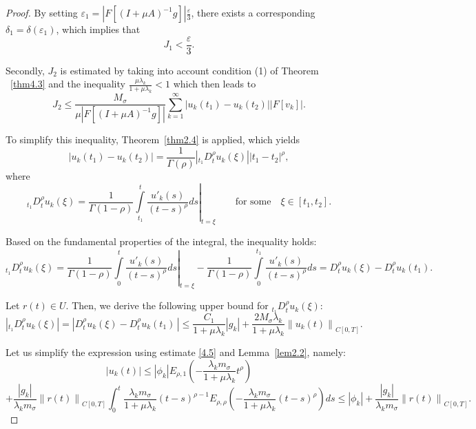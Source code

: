 \documentclass[reqno]{amsart}
\theoremstyle{definition}
\numberwithin{equation}{section}
\begin{document}
\begin{proof}
By setting $\varepsilon_1=\left| F[{{(I+\mu A)}^{-1}}g] \right|\frac{\varepsilon}{3}$, there exists a corresponding $\delta_1=\delta(\varepsilon_1)$, which implies that 
\begin{equation}\label{5.13}
   J_1 <\frac{\varepsilon}{3}. 
\end{equation}

Secondly, $J_2$ is estimated by taking into account condition (1) of Theorem ~\ref{thm4.3} and the inequality $\frac{\mu \lambda_k}{1+\mu \lambda_k}<1$ which then leads to
$$
{{J}_{2}}\le \frac{{{M}_{\sigma }}}{\mu \left| F[{{(I+\mu A)}^{-1}}g] \right|}\sum\limits_{k=1}^{\infty }{\left| {{u}_{k}}\left( {{t}_{1}} \right)-{{u}_{k}}\left( {{t}_{2}} \right) \right|\left| F\left[ {{v}_{k}} \right] \right|}.
$$

To simplify this inequality, Theorem~\ref{thm2.4} is applied, which yields
\begin{equation} \label{5.14}
 \left|u_k\left(t_1\right)-u_k\left(t_2\right)\right| = \frac{1}{\Gamma(\rho)}\left|_{t_1}D_t^\rho u_k(\xi)\right|\left|t_1-t_2\right|^\rho,   
\end{equation}
where 
$$
_{t_1}D_{t}^{\rho }{{u}_{k}}(\xi )=\frac{1}{\Gamma (1-\rho )}{{\left. \int\limits_{{{t}_{1}}}^{t}{\frac{u'_k(s)}{{{(t-s)}^{\rho }}}}ds \right|}_{t=\xi}} \qquad \text{for some} \quad \xi \in [t_1,t_2].
$$

Based on the fundamental properties of the integral, the  inequality holds:
$$
_{{{t}_{1}}}D_{t}^{\rho }{{u}_{k}}(\xi )=\frac{1}{\Gamma (1-\rho )}{{\left. \int\limits_{0}^{t}{\frac{{{{{u}'}}_{k}}(s)}{{{(t-s)}^{\rho }}}}ds \right|}_{t=\xi }}-\frac{1}{\Gamma (1-\rho )}\int\limits_{0}^{{{t}_{1}}}{\frac{{{{{u}'}}_{k}}(s)}{{{(t-s)}^{\rho }}}}ds=D_{t}^{\rho }{{u}_{k}}(\xi )-D_{t}^{\rho }{{u}_{k}}({{t}_{1}}).
$$

Let $r(t) \in U$. Then, we derive the following upper bound for $_{t_1}D_t^{\rho} u_k(\xi)$:
\begin{equation}\label{5.15}
 \left| _{{{t}_{1}}}D_{t}^{\rho }{{u}_{k}}(\xi ) \right|=\left| D_{t}^{\rho }{{u}_{k}}(\xi )-D_{t}^{\rho }{{u}_{k}}({{t}_{1}})\, \right|\le \frac{{{C}_{1}}}{1+\mu {{\lambda }_{k}}}\left| {{g}_{k}} \right|+\frac{2{{M}_{\sigma }}{{\lambda }_{k}}}{1+\mu {{\lambda }_{k}}}{{\left\| {{u}_{k}}(t) \right\|}_{C[0,T]}}. 
\end{equation}

Let us simplify the expression using estimate \eqref{4.5} and Lemma~\eqref{lem2.2}, namely:
$$
\left| {{u}_{k}}(t) \right|\le \left| {{\phi }_{k}} \right|{{E}_{\rho ,1}}\left( -\frac{{{\lambda }_{k}}{{m}_{\sigma }}}{1+\mu {{\lambda }_{k}}}{{t}^{\rho }} \right)
$$
$$
+\frac{\left| {{g}_{k}} \right|}{{{\lambda }_{k}}{{m}_{\sigma }}}{{\left\| r(t) \right\|}_{C[0,T]}}\int_{0}^{t}{\frac{{{\lambda }_{k}}{{m}_{\sigma }}}{1+\mu {{\lambda }_{k}}}{{(t-s)}^{\rho -1}}{{E}_{\rho ,\rho }}\left( -\frac{{{\lambda }_{k}}{{m}_{\sigma }}}{1+\mu {{\lambda }_{k}}}{{(t-s)}^{\rho }} \right)ds}\le \left| {{\phi }_{k}} \right|+\frac{\left| {{g}_{k}} \right|}{{{\lambda }_{k}}{{m}_{\sigma }}}{{\left\| r(t) \right\|}_{C[0,T]}}.
$$


\end{proof}
\end{document}
